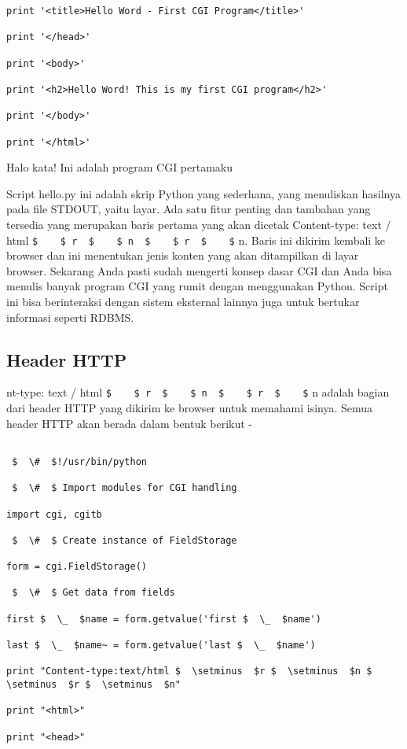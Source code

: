 \begin{enumerate}
\begin{enumerate}
\begin{verbatim}
print '<title>Hello Word - First CGI Program</title>'

print '</head>'

print '<body>'

print '<h2>Hello Word! This is my first CGI program</h2>'

print '</body>'

print '</html>'
\end{verbatim}

Halo kata! Ini adalah program CGI pertamaku

Script hello.py ini adalah skrip Python yang sederhana, yang menuliskan hasilnya pada file STDOUT, yaitu layar. Ada satu fitur penting dan tambahan yang tersedia yang merupakan baris pertama yang akan dicetak Content-type: text / html  \verb|$    $ r  $    $ n  $    $ r  $    $| n. Baris ini dikirim kembali ke browser dan ini menentukan jenis konten yang akan ditampilkan di layar browser. Sekarang Anda pasti sudah mengerti konsep dasar CGI dan Anda bisa menulis banyak program CGI yang rumit dengan menggunakan Python. Script ini bisa berinteraksi dengan sistem eksternal lainnya juga untuk bertukar informasi seperti RDBMS.

\subsection{Header HTTP}
nt-type: text / html  \verb|$    $ r  $    $ n  $    $ r  $    $| n adalah bagian dari header HTTP yang dikirim ke browser untuk memahami isinya. Semua header HTTP akan berada dalam bentuk berikut -

\begin{verbatim}

 $  \#  $!/usr/bin/python

 $  \#  $ Import modules for CGI handling

import cgi, cgitb

 $  \#  $ Create instance of FieldStorage

form = cgi.FieldStorage()

 $  \#  $ Get data from fields

first $  \_  $name = form.getvalue('first $  \_  $name')

last $  \_  $name~ = form.getvalue('last $  \_  $name')

print "Content-type:text/html $  \setminus  $r $  \setminus  $n $  \setminus  $r $  \setminus  $n"

print "<html>"

print "<head>"


\end{verbatim}
\end{enumerate}
\end{enumerate}
